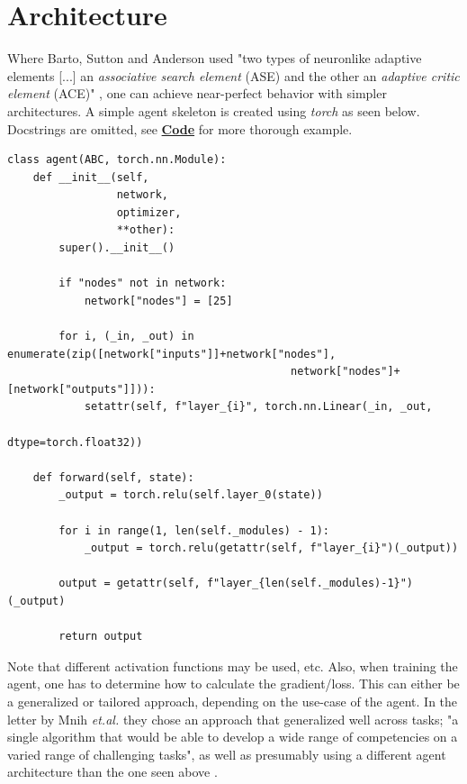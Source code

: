 \documentclass{article}
\let\oldhyperlink\hyperlink
\renewcommand{\hyperlink}[2]{\oldhyperlink{#1}{\textbf{#2}}}
\let\oldcite\cite
\renewcommand{\cite}[1]{\textbf{\oldcite{#1}}}
\begin{document}
\section*{Architecture}

Where Barto, Sutton and Anderson used "two types of neuronlike adaptive elements [...] an \textit{associative search element} (ASE) and the other an \textit{adaptive critic element} (ACE)" \cite{Neuronlike}, one can achieve near-perfect behavior with simpler architectures. A simple agent skeleton is created using \textit{torch} as seen below. Docstrings are omitted, see \hyperlink{sec:code}{Code} for more thorough example.

\begin{lstlisting}
class agent(ABC, torch.nn.Module):
    def __init__(self,
                 network,
                 optimizer,
                 **other):
        super().__init__()

        if "nodes" not in network:
            network["nodes"] = [25]

        for i, (_in, _out) in enumerate(zip([network["inputs"]]+network["nodes"],
                                            network["nodes"]+[network["outputs"]])):
            setattr(self, f"layer_{i}", torch.nn.Linear(_in, _out,
                                                        dtype=torch.float32))

    def forward(self, state):
        _output = torch.relu(self.layer_0(state))

        for i in range(1, len(self._modules) - 1):
            _output = torch.relu(getattr(self, f"layer_{i}")(_output))

        output = getattr(self, f"layer_{len(self._modules)-1}")(_output)

        return output
\end{lstlisting}

Note that different activation functions may be used, etc. Also, when training the agent, one has to determine how to calculate the gradient/loss. This can either be a generalized or tailored approach, depending on the use-case of the agent. In the letter by Mnih \textit{et.al.} they chose an approach that generalized well across tasks; "a single algorithm that would be able to develop a wide range of competencies on a varied range of challenging tasks", as well as presumably using a different agent architecture than the one seen above \cite{Human-level}.
\end{document}
